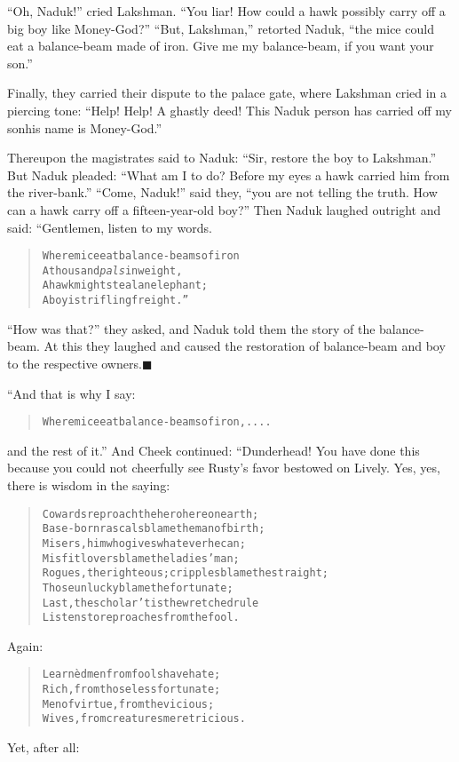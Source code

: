 \documentclass[article, twoside, 14pt]{memoir}
\newcommand{\qed}{\hfill \ensuremath{\blacksquare}}
\renewenvironment{verbatim}{%
\begin{quote}%
\vskip -10pt%
\begin{alltt}\normalfont\large}{\end{alltt}%
\end{quote}%
\vskip -10pt
} %
\begin{document}
``Oh, Naduk!'' cried Lakshman.
``You liar! How could a hawk possibly carry off a big boy like Money-God?''
``But, Lakshman,'' retorted Naduk,
``the mice could eat a balance-beam made of iron. Give me my balance-beam, if you want your son.''

Finally, they carried their dispute to the palace gate, where
Lakshman cried in a piercing tone:
``Help! Help! A ghastly deed! This Naduk person has carried off my son{\textemdash}his name is Money-God.''

Thereupon the magistrates said to Naduk:
``Sir, restore the boy to Lakshman.'' But Naduk pleaded:
``What am I to do? Before my eyes a hawk carried him from the river-bank.''
``Come, Naduk!'' said they,
``you are not telling the truth. How can a hawk carry off a fifteen-year-old boy?''
Then Naduk laughed outright and said: “Gentlemen, listen to my
words.

\begin{verbatim}
Where mice eat balance-beams of iron
    A thousand \emph{pals} in weight,
A hawk might steal an elephant;
    A boy is trifling freight.”
\end{verbatim}
``How was that?'' they asked, and Naduk told them the story of the
balance-beam. At this they laughed and caused the restoration of
balance-beam and boy to the respective owners.\hyperref[s31]{\qed}

“And that is why I say:

\begin{verbatim}
Where mice eat balance-beams of iron, ....
\end{verbatim}
and the rest of it.” And Cheek continued: “Dunderhead! You have
done this because you could not cheerfully see Rusty's favor
bestowed on Lively. Yes, yes, there is wisdom in the saying:

\begin{verbatim}
Cowards reproach the hero here on earth;
Base-born rascals blame the man of birth;
Misers, him who gives whatever he can;
Misfit lovers blame the ladies' man;
Rogues, the righteous; cripples blame the straight;
Those unlucky blame the fortunate;
Last, the scholar{\textemdash}'tis the wretched rule{\textemdash}
Listens to reproaches from the fool.
\end{verbatim}
Again:

\begin{verbatim}
Learnèd men from fools have hate;
Rich, from those less fortunate;
Men of virtue, from the vicious;
Wives, from creatures meretricious.
\end{verbatim}
Yet, after all:
\end{document}
